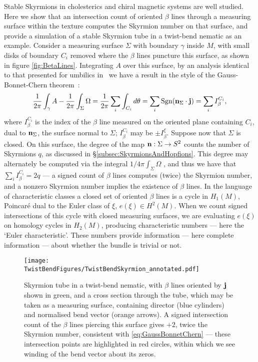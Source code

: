 {Stable Skyrmions in cholesterics \citep{Afghah2017} and chiral magnetic systems \citep{Yu2010} are well studied. Here we show that an intersection count of oriented $\beta$ lines through a measuring surface within the texture computes the Skyrmion number on that surface, and provide a simulation of a stable Skyrmion tube in a twist-bend nematic as an example. Consider a measuring surface $\Sigma$ with boundary $\gamma$ inside $M$, with small disks of boundary $C_i$ removed where the $\beta$ lines puncture this surface, as shown in figure \ref{fig:BetaLines}. Integrating $A$ over this surface, by an analysis identical to that presented for umbilics in~\citep{Machon2016b} we have a result in the style of the Gauss-Bonnet-Chern theorem~\citep{Lee1996,Frankel2015}:
\begin{equation}
    \frac{1}{2\pi}\int_\gamma A - \frac{1}{2\pi}\int_\Sigma \Omega = \frac{1}{2\pi}\sum_i \int_{C_i} d \theta = \sum_i \mathrm{Sgn}(\mathbf{n}_{\Sigma} \cdot \mathbf{j}) = \sum_i I_\beta^{C_i},
    \label{eq:GaussBonnetChern}
\end{equation}
where $I_\beta^{C_i}$ is the index of the $\beta$ line measured on the oriented plane containing $C_i$, dual to $\mathbf{n}_\Sigma$, the surface normal to $\Sigma$; $I_\beta^{C_i}$ may be $\pm I_\beta^\xi$. Suppose now that $\Sigma$ is closed. On this surface, the degree of the map $\mathbf{n} : \Sigma \rightarrow  S^2$ counts the number of Skyrmions $q$, as discussed in \S\ref{subsec:SkyrmionsAndHopfions}. This degree may alternately be computed via the integral $1/4\pi \int_\Sigma \Omega$ \citep{Frankel2015}, and thus we have that $\sum_i I_\beta^{C_i}=2q$ --- a signed count of $\beta$ lines computes (twice) the Skyrmion number, and a nonzero Skyrmion number implies the existence of $\beta$ lines. In the language of characteristic classes \citep{MilnorStasheffBook} a closed set of oriented $\beta$ lines is a cycle in $H_1(M)$, Poincar\'{e} dual to the Euler class of $\xi$, $e(\xi)\in H^2(M)$. When we count signed intersections of this cycle with closed measuring surfaces, we are evaluating $e(\xi)$ on homology cycles in $H_2(M)$, producing characteristic numbers --- here the `Euler characteristic'. These numbers provide information --- here complete information \citep{MilnorStasheffBook} --- about whether the bundle is trivial or not.
\begin{figure}[htbp]
    \centering
    \texttt{[image: \\TwistBendFigures/TwistBendSkyrmion\_annotated.pdf]}
    \caption[Skyrmion tube in a twist-bend nematic.]{Skyrmion tube in a twist-bend nematic, with $\beta$ lines oriented by $\mathbf{j}$ shown in green, and a cross section through the tube, which may be taken as a measuring surface, containing director (blue cylinders) and normalised bend vector (orange arrows). A signed intersection count of the $\beta$ lines piercing this surface gives $+2$, twice the Skyrmion number, consistent with \eqref{eq:GaussBonnetChern} --- these intersection points are highlighted in red circles, within which we see winding of the bend vector about its zeros.}
    \label{fig:TwistBendSkyrmion}
\end{figure}

}
